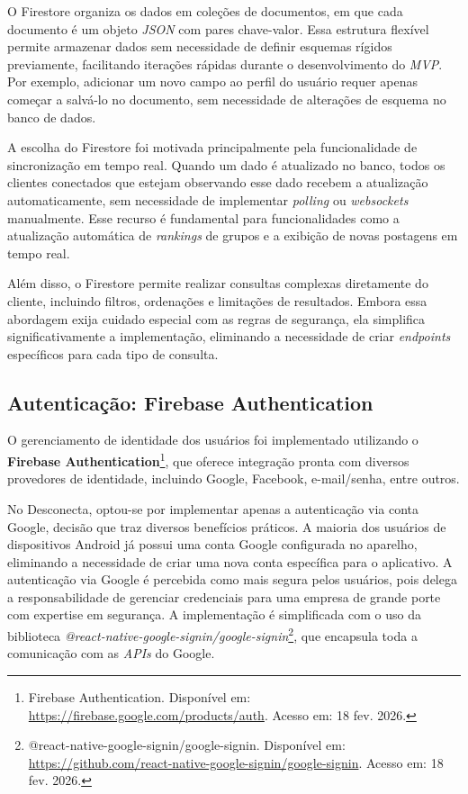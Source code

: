 O Firestore organiza os dados em coleções de documentos, em que cada documento é um objeto \textit{JSON} com pares chave-valor. Essa estrutura flexível permite armazenar dados sem necessidade de definir esquemas rígidos previamente, facilitando iterações rápidas durante o desenvolvimento do \textit{MVP}. Por exemplo, adicionar um novo campo ao perfil do usuário requer apenas começar a salvá-lo no documento, sem necessidade de alterações de esquema no banco de dados.

A escolha do Firestore foi motivada principalmente pela funcionalidade de sincronização em tempo real. Quando um dado é atualizado no banco, todos os clientes conectados que estejam observando esse dado recebem a atualização automaticamente, sem necessidade de implementar \textit{polling} ou \textit{websockets} manualmente. Esse recurso é fundamental para funcionalidades como a atualização automática de \textit{rankings} de grupos e a exibição de novas postagens em tempo real.

Além disso, o Firestore permite realizar consultas complexas diretamente do cliente, incluindo filtros, ordenações e limitações de resultados. Embora essa abordagem exija cuidado especial com as regras de segurança, ela simplifica significativamente a implementação, eliminando a necessidade de criar \textit{endpoints} específicos para cada tipo de consulta.

\subsection{Autenticação: Firebase Authentication}

O gerenciamento de identidade dos usuários foi implementado utilizando o \textbf{Firebase Authentication}\footnote{Firebase Authentication. Disponível em: \url{https://firebase.google.com/products/auth}. Acesso em: 18 fev. 2026.}, que oferece integração pronta com diversos provedores de identidade, incluindo Google, Facebook, e-mail/senha, entre outros.

No Desconecta, optou-se por implementar apenas a autenticação via conta Google, decisão que traz diversos benefícios práticos. A maioria dos usuários de dispositivos Android já possui uma conta Google configurada no aparelho, eliminando a necessidade de criar uma nova conta específica para o aplicativo. A autenticação via Google é percebida como mais segura pelos usuários, pois delega a responsabilidade de gerenciar credenciais para uma empresa de grande porte com expertise em segurança. A implementação é simplificada com o uso da biblioteca \textit{@react-native-google-signin/google-signin}\footnote{@react-native-google-signin/google-signin. Disponível em: \url{https://github.com/react-native-google-signin/google-signin}. Acesso em: 18 fev. 2026.}, que encapsula toda a comunicação com as \textit{APIs} do Google.


